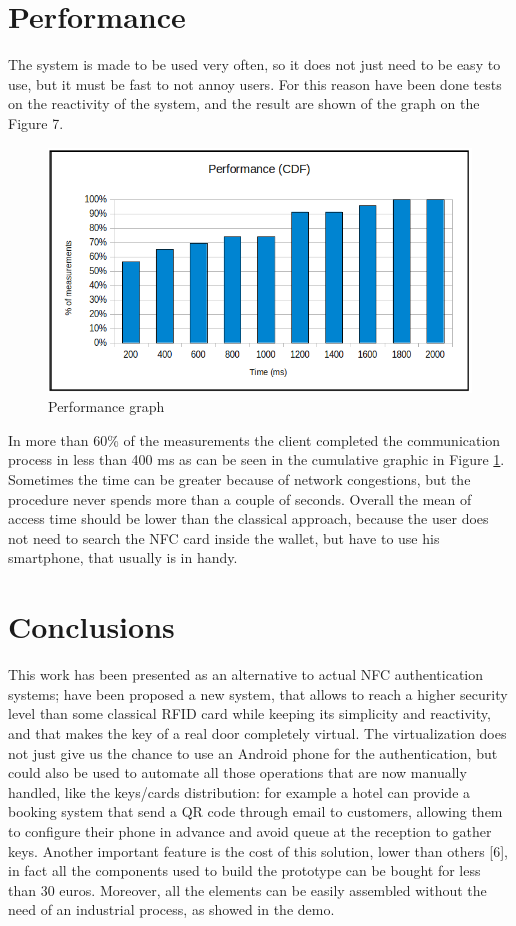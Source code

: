 \documentclass[conference]{IEEEtran}
\begin{document}
\section{Performance}

The system is made to be used very often, so it does not just need to be easy to use, but it must be fast to not annoy users. For this reason have been done tests on the reactivity of the system, and the result are shown of the graph on the Figure 7.

\begin{figure}[h]
\centering
\includegraphics[scale=0.35]{fig7}
\caption{Performance graph}
\label{graph}
\end{figure}

In more than 60\% of the measurements the client completed the communication process in less than 400 ms as can be seen in the cumulative graphic in Figure \ref{graph}.  Sometimes the time can be greater because of network congestions, but the procedure never spends more than a couple of seconds. 
Overall the mean of access time should be lower than the classical approach, because the user does not need to search the NFC card inside the wallet, but have to use his smartphone, that usually is in handy.

\section{Conclusions}

This work has been presented as an alternative to actual NFC authentication systems; have been proposed a new system, that allows to reach a higher security level than some classical RFID card while keeping its simplicity and reactivity, and that makes the key of a real door completely virtual. The virtualization does not just give us the chance to use an Android phone for the authentication, but could also be used to automate all those operations that are now manually handled, like the keys/cards distribution: for example a hotel can provide a booking system that send a QR code through email to customers, allowing them to configure their phone in advance and avoid queue at the reception to gather keys.
Another important feature is the cost of this solution, lower than others [6], in fact all the components used to build the prototype can be bought for less than 30 euros. Moreover, all the elements can be easily assembled without the need of an industrial process, as showed in the demo.
\end{document}
